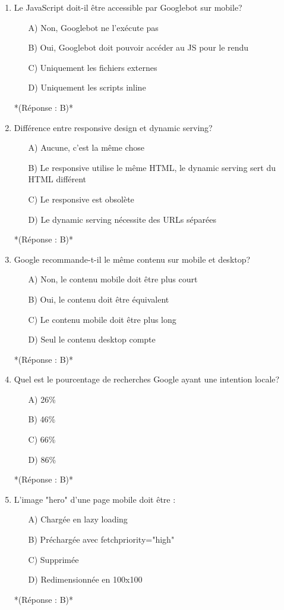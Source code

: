 \documentclass[12pt,a4paper,twoside]{report}
\begin{document}
\begin{enumerate}
\item Le JavaScript doit-il être accessible par Googlebot sur mobile?
\begin{itemize}
\item[A)] Non, Googlebot ne l'exécute pas
\item[B)] Oui, Googlebot doit pouvoir accéder au JS pour le rendu
\item[C)] Uniquement les fichiers externes
\item[D)] Uniquement les scripts inline
\end{itemize}
*(Réponse : B)*

\item Différence entre responsive design et dynamic serving?
\begin{itemize}
\item[A)] Aucune, c'est la même chose
\item[B)] Le responsive utilise le même HTML, le dynamic serving sert du HTML différent
\item[C)] Le responsive est obsolète
\item[D)] Le dynamic serving nécessite des URLs séparées
\end{itemize}
*(Réponse : B)*

\item Google recommande-t-il le même contenu sur mobile et desktop?
\begin{itemize}
\item[A)] Non, le contenu mobile doit être plus court
\item[B)] Oui, le contenu doit être équivalent
\item[C)] Le contenu mobile doit être plus long
\item[D)] Seul le contenu desktop compte
\end{itemize}
*(Réponse : B)*

\item Quel est le pourcentage de recherches Google ayant une intention locale?
\begin{itemize}
\item[A)] 26\%
\item[B)] 46\%
\item[C)] 66\%
\item[D)] 86\%
\end{itemize}
*(Réponse : B)*

\item L'image "hero" d'une page mobile doit être :
\begin{itemize}
\item[A)] Chargée en lazy loading
\item[B)] Préchargée avec fetchpriority="high"
\item[C)] Supprimée
\item[D)] Redimensionnée en 100x100
\end{itemize}
*(Réponse : B)*


\end{enumerate}
\end{document}
